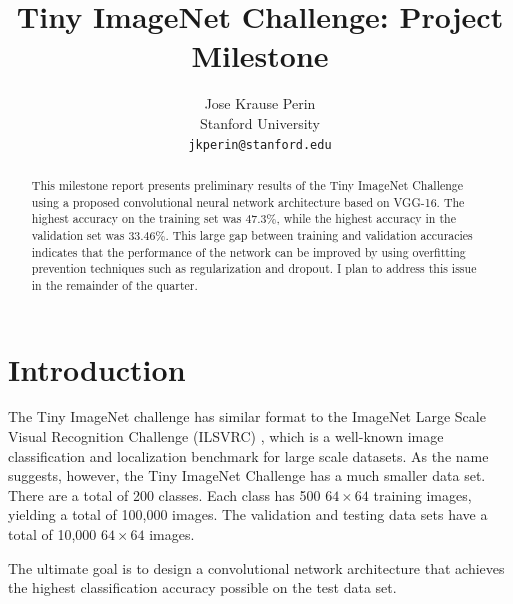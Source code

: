 \documentclass[10pt,twocolumn,letterpaper]{article}
\begin{document}
\title{Tiny ImageNet Challenge: Project Milestone}

\author{Jose Krause Perin\\
Stanford University\\
{\tt\small jkperin@stanford.edu}
}

\maketitle

\begin{abstract}
This milestone report presents preliminary results of the Tiny ImageNet Challenge using a proposed convolutional neural network architecture based on VGG-16. The highest accuracy on the training set was $47.3\%$, while the highest accuracy in the validation set was $33.46\%$. This large gap between training and validation accuracies indicates that the performance of the network can be improved by using overfitting prevention techniques such as regularization and dropout. I plan to address this issue in the remainder of the quarter. 
\end{abstract}

\section{Introduction}

The Tiny ImageNet challenge has similar format to the ImageNet Large Scale Visual Recognition Challenge (ILSVRC) \cite{ILSVRC15}, which is a well-known image classification and localization benchmark for large scale datasets. As the name suggests, however, the Tiny ImageNet Challenge has a much smaller data set. There are a total of 200 classes. Each class has 500 $64\times 64$ training images, yielding a total of 100,000 images. The validation and testing data sets have a total of 10,000 $64\times 64$ images. 

The ultimate goal is to design a convolutional network architecture that achieves the highest classification accuracy possible on the test data set.
\end{document}
